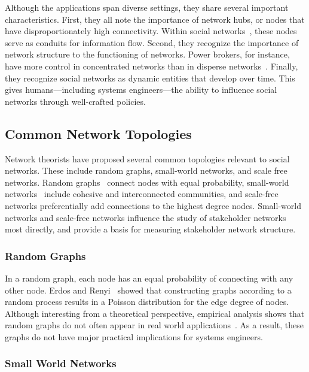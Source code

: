 Although the applications span diverse settings, they share several important characteristics. First, they all note the importance of network hubs, or nodes that have disproportionately high connectivity. Within social networks~\cite{barbasi}, these nodes serve as conduits for information flow. Second, they recognize the importance of network structure to the functioning of networks. Power brokers, for instance, have more control in concentrated networks than in disperse networks~\cite{slaughter}. Finally, they recognize social networks as dynamic entities that develop over time. This gives humans---including systems engineers---the ability to influence social networks through well-crafted policies.

\subsection{Common Network Topologies}

Network theorists have proposed several common topologies relevant to social networks. These include random graphs, small-world networks, and scale free networks. Random graphs~\cite{erdos} connect nodes with equal probability, small-world networks~\cite{watts} include cohesive and interconnected communities, and scale-free~\cite{barbasi} networks preferentially add connections to the highest degree nodes. Small-world networks and scale-free networks influence the study of stakeholder networks most directly, and provide a basis for measuring stakeholder network structure.

\subsubsection{Random Graphs}

In a random graph, each node has an equal probability of connecting with any other node. Erdos and Renyi~\cite{erdos} showed that constructing graphs according to a random process results in a Poisson distribution for the edge degree of nodes. Although interesting from a theoretical perspective, empirical analysis shows that random graphs do not often appear in real world applications~\cite{barbasi}. As a result, these graphs do not have major practical implications for systems engineers.

\subsubsection{Small World Networks}

